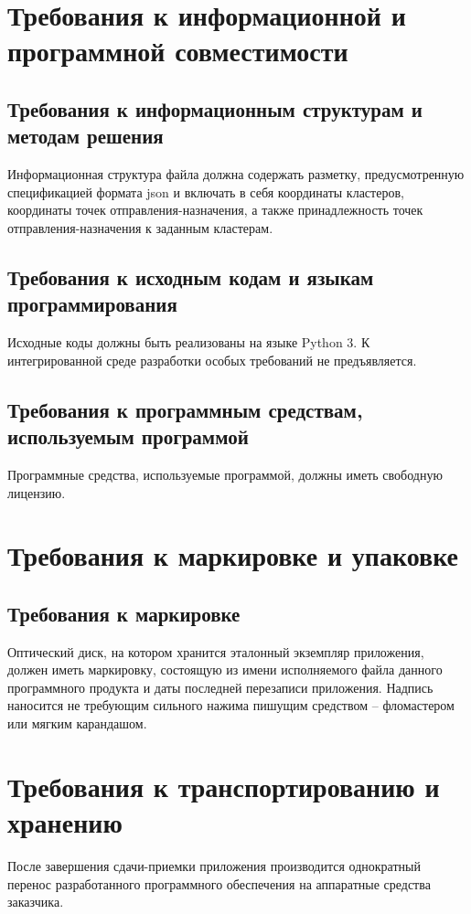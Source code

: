 \section{Требования к информационной и программной совместимости}
\subsection{Требования к информационным структурам и методам решения}
Информационная структура файла должна содержать разметку, предусмотренную спецификацией формата json и 
включать в себя координаты кластеров, координаты точек отправления-назначения, а также принадлежность точек 
отправления-назначения к заданным кластерам.

\subsection{Требования к исходным кодам и языкам программирования}
Исходные коды должны быть реализованы на языке Python 3. К интегрированной среде разработки особых требований 
не предъявляется.

\subsection{Требования к программным средствам, используемым программой}
Программные средства, используемые программой, должны иметь свободную лицензию.

\section{Требования к маркировке и упаковке}
\subsection{Требования к маркировке}
Оптический диск, на котором хранится эталонный экземпляр приложения, должен иметь маркировку, состоящую из 
имени исполняемого файла данного программного продукта и даты последней перезаписи приложения. Надпись 
наносится не требующим сильного нажима пишущим средством -- фломастером или мягким карандашом.

\section{Требования к транспортированию и хранению}
После завершения сдачи-приемки приложения производится однократный перенос разработанного программного 
обеспечения на аппаратные средства заказчика.

